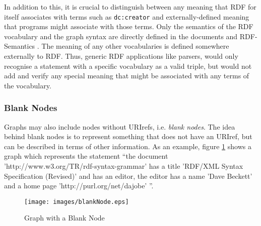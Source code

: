 \documentclass[11pt,a4paper,headsepline, bibtotoc]{scrreprt}
\begin{document}
In addition to this, it is crucial to distinguish between any meaning that RDF for itself associates with terms such as \texttt{dc:creator} and externally-defined meaning that programs might associate with those terms. Only the semantics of the RDF vocabulary and the graph syntax are directly defined in the documents \cite{RDF:Syntax} and RDF-Semantics \cite{RDF:Semantics}. The meaning of any other vocabularies is defined somewhere externally to RDF. Thus, generic RDF applications like parsers, would only recognise a statement with a specific vocabulary as a valid triple, but would not add and verify any special meaning that might be associated with any terms of the vocabulary.

\subsubsection{Blank Nodes}\label{blanknodes}
Graphs may also include nodes without URIrefs, i.e. \textit{blank nodes}. The idea behind blank nodes is to represent something that does not have an URIref, but can be described in terms of other information. As an example, figure \ref{graph3} shows a graph which represents the statement ``the document 'http://www.w3.org/TR/rdf-syntax-grammar' has a title 'RDF/XML Syntax Specification (Revised)' and has an editor, the editor has a name 'Dave Beckett' and a home page 'http://purl.org/net/dajobe' ''.
\begin{figure}[H]
        \caption{Graph with a Blank Node}
        \label{graph3}
        \texttt{[image: images/blankNode.eps]}
\end{figure}
\end{document}
